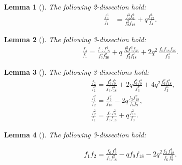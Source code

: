 \documentclass[10pt,a4paper]{amsart}
\newtheorem{lma}{Lemma}[section]
\numberwithin{equation}{section}
\begin{document}
	\begin{lma}[{\cite{hirschhorn1993cubic}}]The following 2-dissection hold:
		\begin{align}
			\frac{f_3^3}{f_1} &= \frac{f_4^3f_6^2}{f_2^2f_{12}}+q\frac{f_{12}^3}{f_4}.\label{f33byf1}
		\end{align}
	\end{lma}
	
	\begin{lma}[{\cite{mdb}}] The following 3-dissection hold:
		\begin{align}
			\frac{f_4}{f_1}=\frac{f_{12}f_{18}^{4}}{f_3^{3}f_{36}^{2}}+q\,\frac{f_6^{2}f_9^{3}f_{36}}{f_3^{4}f_{18}^{2}}+2q^{2}\,\frac{f_6f_{18}f_{36}}{f_3^{3}}.\label{f4byf1}
	\end{align}\end{lma}
	\begin{lma}[{\cite{mdb}}] The following 3-dissections hold:
		\begin{align}
			&\frac{f_2}{f_1^2} = \frac{f_6^4 f_9^6}{f_3^8 f_{18}^3} + 2q \frac{f_6^3 f_9^3}{f_3^7} + 4q^2 \frac{f_6^2 f_{18}^3}{f_3^6},\label{f2byf12}\\
			&\frac{f_1^2}{f_2} = \frac{f_9^2}{f_{18}} - 2q \frac{f_3 f_{18}^2}{f_6 f_9},\label{f12byf2}\\
			&\frac{f_2^2}{f_1} = \frac{f_6f_9^2}{f_3f_{18}} +q \frac{ f_{18}^2}{ f_9}.\label{f22byf1}
	\end{align}\end{lma}
	\begin{lma} [{\cite{hirschhorn2014congruence}}] The following 3-dissection hold:
		
		\begin{align}
			f_1f_2=\frac{f_6\,f_9^4}{f_3f_{18}^2}
			-qf_9f_{18}-2q^2\frac{f_3\,f_{18}^4}{f_6\,f_9^2}.\label{f1f2}
		\end{align}
	\end{lma}
	
\end{document}
